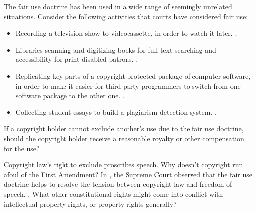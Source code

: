 \item The fair use doctrine has been used in a wide range of seemingly unrelated
situations. Consider the following activities that courts have considered fair
use:
\begin{itemize}
\item Recording a television show to videocassette, in order to watch it later.
.

\item Libraries scanning and digitizing books for full-text searching and
accessibility for print-disabled patrons. .

\item Replicating key parts of a copyright-protected package of computer
software, in order to make it easier for third-party programmers to switch from
one software package to the other one. .

\item Collecting student essays to build a plagiarism detection system.
.
\end{itemize}


\item {} If a copyright holder cannot exclude another's use due to
the fair use doctrine, should the copyright holder receive a reasonable royalty
or other compensation for the use?





\item Copyright law's right to exclude proscribes speech. Why doesn't copyright
run afoul of the First Amendment? In , the Supreme Court
observed that the fair use doctrine helps to resolve the tension between
copyright law and freedom of speech. .
What other constitutional rights might come into conflict with intellectual
property rights, or property rights generally?

